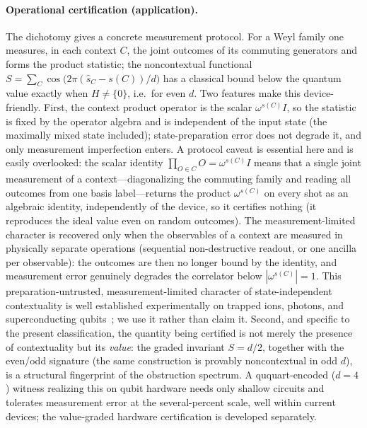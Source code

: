 \documentclass[11pt]{article}
\theoremstyle{remark}
\begin{document}
\paragraph{Operational certification (application).} The dichotomy gives a concrete measurement
protocol. For a Weyl family one measures, in each context $C$, the joint outcomes of its commuting
generators and forms the product statistic; the noncontextual functional
$S=\sum_C \cos\!\big(2\pi(\hat s_C-s(C))/d\big)$ has a classical bound below the quantum value exactly
when $H\neq\{0\}$, i.e.\ for even $d$. Two features make this device-friendly. First, the context
product operator is the scalar $\omega^{s(C)}I$, so the statistic is fixed by the operator algebra and
is independent of the input state (the maximally mixed state included); state-preparation error does
not degrade it, and only measurement imperfection enters. A protocol caveat is essential here and is
easily overlooked: the scalar identity $\prod_{O\in C}O=\omega^{s(C)}I$ means that a single joint
measurement of a context---diagonalizing the commuting family and reading all outcomes from one basis
label---returns the product $\omega^{s(C)}$ on every shot as an algebraic identity, independently of
the device, so it certifies nothing (it reproduces the ideal value even on random outcomes). The
measurement-limited character is recovered only when the observables of a context are measured in
physically separate operations (sequential non-destructive readout, or one ancilla per observable):
the outcomes are then no longer bound by the identity, and measurement error genuinely degrades the
correlator below $|\omega^{s(C)}|=1$. This preparation-untrusted, measurement-limited character of
state-independent contextuality is well established experimentally on trapped ions, photons, and
superconducting qubits~\cite{Kirchmair,Qu,EJP}; we use it rather than claim it. Second, and specific
to the present classification, the quantity being certified is not merely the presence of
contextuality but its \emph{value}: the graded invariant $S=d/2$, together with the even/odd signature
(the same construction is provably noncontextual in odd $d$), is a structural fingerprint of the
obstruction spectrum. A ququart-encoded ($d=4$) witness realizing this on qubit hardware needs only
shallow circuits and tolerates measurement error at the several-percent scale, well within current
devices; the value-graded hardware certification is developed separately.
\end{document}
